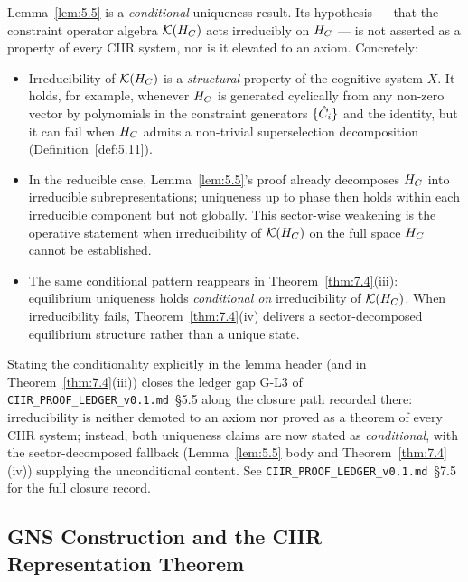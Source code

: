 \begin{remark}
\label{rem:5.5.scope}
Lemma~\ref{lem:5.5} is a \emph{conditional} uniqueness result.  Its
hypothesis — that the constraint operator algebra $\mathcal{K}(H_C)$ acts
irreducibly on $H_C$ — is not asserted as a property of every
CIIR system, nor is it elevated to an axiom.  Concretely:
\begin{itemize}
  \item Irreducibility of $\mathcal{K}(H_C)$ is a \emph{structural} property
    of the cognitive system $X$.  It holds, for example, whenever
    $H_C$ is generated cyclically from any non-zero vector by
    polynomials in the constraint generators $\{\hat{C}_i\}$ and the
    identity, but it can fail when $H_C$ admits a non-trivial
    superselection decomposition
    (Definition~\textup{\ref{def:5.11}}).
  \item In the reducible case, Lemma~\ref{lem:5.5}'s proof already
    decomposes $H_C$ into irreducible subrepresentations; uniqueness
    up to phase then holds within each irreducible component but
    not globally.  This sector-wise weakening is the operative
    statement when irreducibility of $\mathcal{K}(H_C)$ on the full space
    $H_C$ cannot be established.
  \item The same conditional pattern reappears in
    Theorem~\textup{\ref{thm:7.4}(iii)}: equilibrium uniqueness
    holds \emph{conditional on} irreducibility of $\mathcal{K}(H_C)$.  When
    irreducibility fails, Theorem~\textup{\ref{thm:7.4}(iv)}
    delivers a sector-decomposed equilibrium structure rather than
    a unique state.
\end{itemize}
Stating the conditionality explicitly in the lemma header (and in
Theorem~\textup{\ref{thm:7.4}(iii)}) closes the ledger gap G-L3 of
\texttt{CIIR\_PROOF\_LEDGER\_v0.1.md}~\S5.5 along the closure path
recorded there: irreducibility is neither demoted to an axiom nor
proved as a theorem of every CIIR system; instead, both uniqueness
claims are now stated as \emph{conditional}, with the
sector-decomposed fallback (Lemma~\textup{\ref{lem:5.5}} body and
Theorem~\textup{\ref{thm:7.4}(iv)}) supplying the unconditional
content.  See \texttt{CIIR\_PROOF\_LEDGER\_v0.1.md}~\S7.5 for the
full closure record.
\end{remark}

\subsection{GNS Construction and the CIIR Representation Theorem}
\label{sec:ch5:gns}

